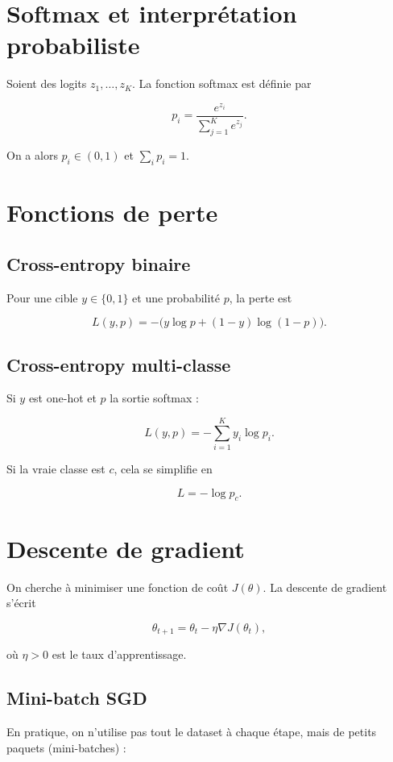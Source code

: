\documentclass[11pt,a4paper]{article}
\begin{document}
\section{Softmax et interprétation probabiliste}

Soient des logits $z_1,\dots,z_K$. La fonction softmax est définie par

\[
p_i = \frac{e^{z_i}}{\sum_{j=1}^K e^{z_j}}.
\]

On a alors $p_i \in (0,1)$ et $\sum_i p_i = 1$.

\section{Fonctions de perte}

\subsection{Cross-entropy binaire}

Pour une cible $y \in \{0,1\}$ et une probabilité $p$, la perte est

\[
L(y,p) = -\bigl(y\log p + (1-y)\log(1-p)\bigr).
\]

\subsection{Cross-entropy multi-classe}

Si $y$ est one-hot et $p$ la sortie softmax :

\[
L(y,p) = -\sum_{i=1}^K y_i \log p_i.
\]

Si la vraie classe est $c$, cela se simplifie en

\[
L = -\log p_c.
\]

\section{Descente de gradient}

On cherche à minimiser une fonction de coût $J(\theta)$. La descente de gradient s'écrit

\[
\theta_{t+1} = \theta_t - \eta \nabla J(\theta_t),
\]

où $\eta > 0$ est le taux d'apprentissage.

\subsection{Mini-batch SGD}

En pratique, on n'utilise pas tout le dataset à chaque étape, mais de petits paquets (mini-batches) :
\end{document}
